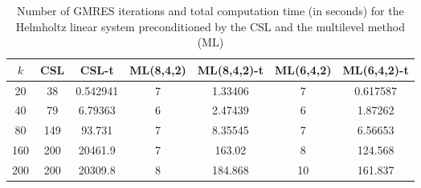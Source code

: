 \begin{table}[t]
\centering
\begin{tabular}{ccccccc}
\hline
$k$ & CSL & CSL-t & ML(8,4,2) & ML(8,4,2)-t& ML(6,4,2) & ML(6,4,2)-t \\ \hline
20 & 38 & 0.542941 & 7 & 1.33406 & 7 & 0.617587 \\
40 & 79 & 6.79363 & 6 & 2.47439 & 6 & 1.87262 \\
80 & 149 & 93.731 & 7 & 8.35545 & 7 & 6.56653 \\
160 & 200 & 20461.9 & 7 & 163.02 & 8 & 124.568 \\
200 & 200 & 20309.8 & 8 & 184.868 & 10 & 161.837 \\
\hline
\end{tabular}
\caption{Number of GMRES iterations and total computation time (in seconds) for the Helmholtz linear system preconditioned by the  CSL and the multilevel method (ML)}
\label{table:mlgmres_csl_vs_adef_coarse_eps_20}
\end{table}
